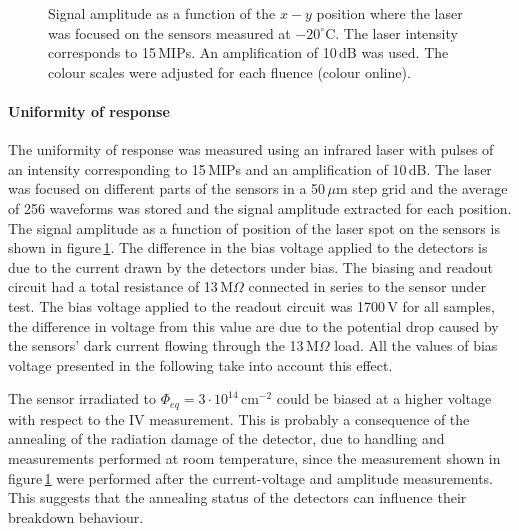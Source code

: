 \documentclass[review,number,sort&compress]{elsarticle}
\begin{document}
\begin{figure}[h]
  \caption{Signal amplitude as a function of the $x-y$ position where the laser was focused on the sensors measured at $-20^\circ$C. The laser intensity corresponds to 15\,MIPs. An amplification of 10\,dB was used. The colour scales were adjusted for each fluence (colour online).}
  \label{fig:xyScanIR_2x2}
\end{figure}

\paragraph{Uniformity of response}
The uniformity of response was measured using an infrared laser with pulses of an intensity corresponding to 15\,MIPs and an amplification of 10\,dB.
The laser was focused on different parts of the sensors in a 50\,$\mu$m step grid and the average of 256 waveforms was stored and the signal amplitude extracted for each position.
The signal amplitude as a function of position of the laser spot on the sensors is shown in figure\,\ref{fig:xyScanIR_2x2}.
The difference in the bias voltage applied to the detectors is due to the current drawn by the detectors under bias.
The biasing and readout circuit had a total resistance of 13\,M$\Omega$ connected in series to the sensor under test.
The bias voltage applied to the readout circuit was 1700\,V for all samples, the difference in voltage from this value are due to the potential drop caused by the sensors' dark current flowing through the 13\,M$\Omega$ load.
All the values of bias voltage presented in the following take into account this effect.

The sensor irradiated to $\Phi_{eq} = 3 \cdot 10^{14}$\,cm$^{-2}$ could be biased at a higher voltage with respect to the IV measurement.
This is probably a consequence of the annealing of the radiation damage of the detector, due to handling and measurements performed at room temperature, since the measurement shown in figure\,\ref{fig:xyScanIR_2x2} were performed after the current-voltage and amplitude measurements.
This suggests that the annealing status of the detectors can influence their breakdown behaviour.
\end{document}
